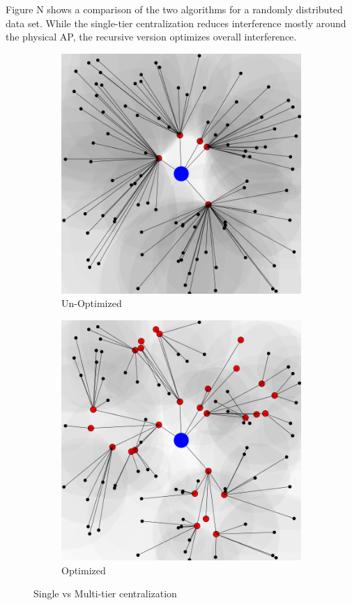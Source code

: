 \documentclass{sigcomm-alternate}
\begin{document}
Figure N shows a comparison of the two algorithms for a randomly distributed data set. While the single-tier centralization reduces interference mostly around the physical AP, the recursive version optimizes overall interference.

\begin{figure}[ht]
\centering
\begin{subfigure}{0.45\linewidth}
\includegraphics[scale=0.15]{ianNotRecursive.png}
\caption{Un-Optimized}
\end{subfigure}
\quad
\begin{subfigure}{0.45\linewidth}
\includegraphics[scale=0.15]{ianRecursive.png}
\caption{Optimized}
\end{subfigure}
\caption{Single vs Multi-tier centralization}
\end{figure}
\end{document}
